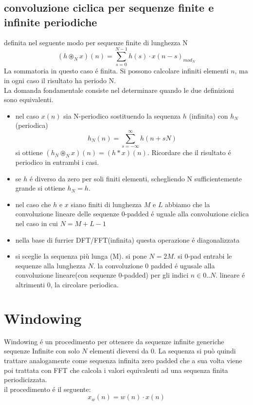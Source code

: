 \documentclass[11pt,a4paper,DIV12,BCOR1.5mm]{scrartcl}
\begin{document}
\subsection{convoluzione ciclica per sequenze finite e infinite periodiche}
definita nel seguente modo per sequenze finite di lunghezza N
\begin{equation}
(h \circledast_N x)(n) = \sum_{s=0}^{N-1} h(s)\cdot x(n-s)_{mod_N}
\end{equation}
La sommatoria in questo caso é finita. Si possono calcolare infiniti elementi $n$, ma in ogni caso il risultato ha periodo N.\\

La domanda fondamentale consiste nel determinare quando le due definizioni sono equivalenti.

\begin{itemize}
	\item nel caso $x(n)$ sia N-periodico sostituendo la sequenza $h$ (infinita) con $h_N$ (periodica)
	\begin{equation}
	h_N(n) = \sum_{s=-\infty}^{\infty} h(n+sN)
	\end{equation}
	si ottiene $(h_N \circledast_N x)(n) = (h\ast x)(n) $. Ricordare che il risultato é periodico in entrambi i casi.
	\item se $h$ é diverso da zero per soli finiti elementi, schegliendo N sufficientemente grande si ottiene $h_N = h$.
	\item nel caso che $h$ e $x$ siano finiti di lunghezza $M$ e $L$ abbiamo che la convoluzione lineare delle sequenze 0-padded é uguale alla convoluzione ciclica nel caso in cui $N = M+L-1$
	
	\item  nella base di furrier DFT/FFT(infinita) questa operazione é diagonalizzata

	\item si sceglie la sequenza più lunga (M). si pone $N=2M$. si 0-pad entrabi le sequenze alla lunghezza $N$. la convoluzione 0 padded é ugusale alla convoluzione lineare(con sequenze 0-padded) per gli indici $n \in 0..N$. lineare é altrimenti 0, la circolare periodica.
\end{itemize}


\section{Windowing}
 Windowing é un procedimento per ottenere da sequenze infinite generiche sequenze Infinite con solo $N$ elementi dieversi da 0.  La sequenza si può quindi trattare analogamente come sequenza infinita zero padded che a sua volta viene poi trattata con FFT che calcola i valori equivalenti ad una sequenza finita periodicizzata.\\
 il procedimento  é il seguente:
 \begin{equation}
 x_w(n) = w(n)\cdot x(n)
 \end{equation}
 
\end{document}
